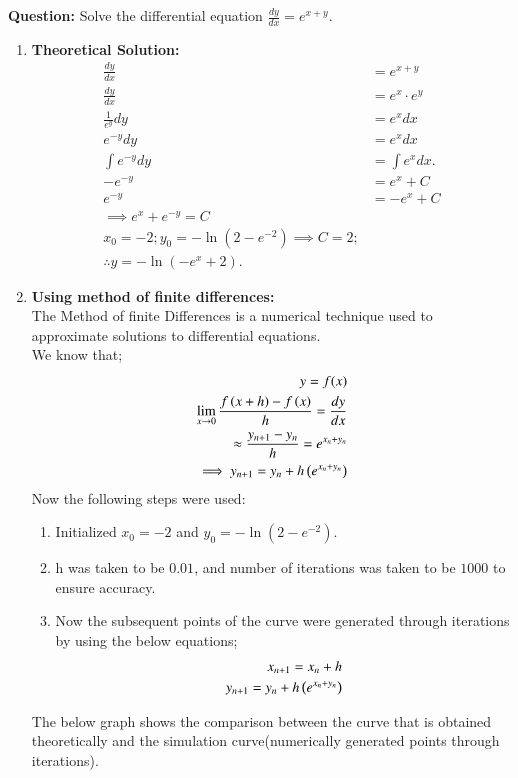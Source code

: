 \documentclass[journal]{IEEEtran}
\begin{document}
\textbf{Question:}
Solve the differential equation $\frac{dy}{dx} = e^{x+y}$.\\
\begin{enumerate}
    \item \textbf{Theoretical Solution:}\\
\begin{align}
	\frac{dy}{dx} &= e^{x+y}\\
	\frac{dy}{dx} &= e^x \cdot e^y\\
	\frac{1}{e^y} dy &= e^x dx\\
	e^{-y} dy &= e^x dx\\
        \int e^{-y} dy &= \int e^x dx.\\
	-e^{-y} &= e^x + C\\
	e^{-y} &= -e^x + C\\
	\implies e^x + e^{-y} = C\\
	x_0=-2; y_0=-\ln(2-e^{-2})\implies C=2;\\
	\therefore y = -\ln(-e^x + 2).
\end{align}
\item \textbf{Using method of finite differences:}\\The Method of finite Differences is a numerical technique used to approximate solutions to differential equations.\\
    We know that;\\
    \begin{align}
	    y=f(x)\\        
	    \lim_{x\to 0}\frac{f\left(x+h\right)-f\left(x\right)}{h}=\frac{dy}{dx}\\
	    \approx \frac{y_{n+1}-y_n}{h}=e^{x_n+y_n}\\
	    \implies y_{n+1}=y_n+h\left(e^{x_n+y_n}\right)
    \end{align}
       Now the following steps were used:
    \begin{enumerate}
	    \item Initialized $x_0=-2$ and $y_0=-\ln(2-e^{-2})$.
        \item h was taken to be $0.01$, and number of iterations was taken to be $1000$ to ensure accuracy.
        \item Now the subsequent points of the curve were generated through iterations by using the below equations;
        \begin{align}
            x_{n+1}=x_n+h\\
            y_{n+1}=y_n+h\left(e^{x_n+y_n}\right)
        \end{align}
    \end{enumerate}
    The below graph shows the comparison between the curve that is obtained theoretically and the simulation curve(numerically generated points through iterations).
\end{enumerate}
\end{document}
